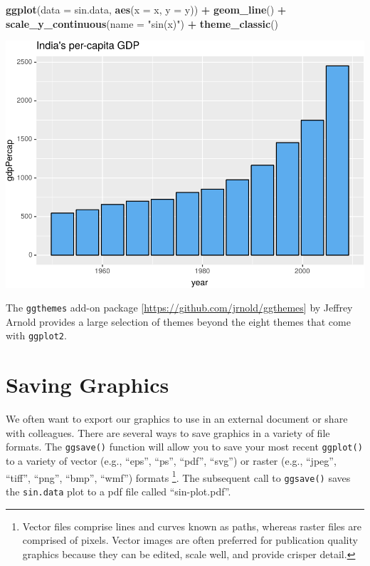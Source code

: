 \documentclass[]{krantz}
\makeatletter
\newenvironment{Shaded}{\begin{snugshade}}{\end{snugshade}}
\newcommand{\DataTypeTok}[1]{\textcolor[rgb]{0.27,0.27,0.27}{#1}}
\newcommand{\KeywordTok}[1]{\textcolor[rgb]{0.27,0.27,0.27}{\textbf{#1}}}
\newcommand{\NormalTok}[1]{#1}
\newcommand{\OperatorTok}[1]{\textcolor[rgb]{0.43,0.43,0.43}{\textbf{#1}}}
\newcommand{\StringTok}[1]{\textcolor[rgb]{0.5,0.5,0.5}{#1}}
\newenvironment{kframe}{%
\medskip{}
\setlength{\fboxsep}{.8em}
 \def\at@end@of@kframe{}%
 \ifinner\ifhmode%
  \def\at@end@of@kframe{\end{minipage}}%
  \begin{minipage}{\columnwidth}%
 \fi\fi%
 \def\FrameCommand##1{\hskip\@totalleftmargin \hskip-\fboxsep
 \colorbox{shadecolor}{##1}\hskip-\fboxsep
     \hskip-\linewidth \hskip-\@totalleftmargin \hskip\columnwidth}%
 \MakeFramed {\advance\hsize-\width
   \@totalleftmargin\z@ \linewidth\hsize
   \@setminipage}}%
 {\par\unskip\endMakeFramed%
 \at@end@of@kframe}
\renewenvironment{Shaded}{\begin{kframe}}{\end{kframe}}
\makeatother
\begin{document}
\begin{Shaded}
\begin{Highlighting}[]
\KeywordTok{ggplot}\NormalTok{(}\DataTypeTok{data =}\NormalTok{ sin.data, }\KeywordTok{aes}\NormalTok{(}\DataTypeTok{x =}\NormalTok{ x, }\DataTypeTok{y =}\NormalTok{ y)) }\OperatorTok{+}\StringTok{ }\KeywordTok{geom_line}\NormalTok{() }\OperatorTok{+}\StringTok{ }
\StringTok{    }\KeywordTok{scale_y_continuous}\NormalTok{(}\DataTypeTok{name =} \StringTok{"sin(x)"}\NormalTok{) }\OperatorTok{+}
\StringTok{    }\KeywordTok{theme_classic}\NormalTok{()}
\end{Highlighting}
\end{Shaded}

\includegraphics{bookdown_files/figure-latex/unnamed-chunk-81-1.pdf}

The \texttt{ggthemes} add-on package {[}\url{https://github.com/jrnold/ggthemes}{]} by Jeffrey Arnold provides a large selection of themes beyond the eight themes that come with \texttt{ggplot2}.

\hypertarget{saving-graphics}{%
\section{Saving Graphics}\label{saving-graphics}}

We often want to export our graphics to use in an external document or share with colleagues. There are several ways to save graphics in a variety of file formats. The \texttt{ggsave()} function will allow you to save your most recent \texttt{ggplot()} to a variety of vector (e.g., ``eps'', ``ps'', ``pdf'', ``svg'') or raster (e.g., ``jpeg'', ``tiff'', ``png'', ``bmp'', ``wmf'') formats \footnote{Vector files comprise lines and curves known as paths, whereas raster files are comprised of pixels. Vector images are often preferred for publication quality graphics because they can be edited, scale well, and provide crisper detail.}. The subsequent call to \texttt{ggsave()} saves the \texttt{sin.data} plot to a pdf file called ``sin-plot.pdf''.
\end{document}
